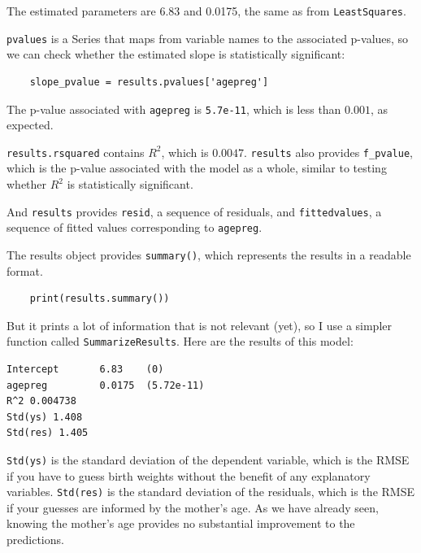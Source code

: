 \documentclass[12pt]{book}
\begin{document}
The estimated parameters are 6.83 and 0.0175, the same as
from \verb"LeastSquares".

\verb"pvalues" is a Series that maps from variable names to the associated
p-values, so we can check whether the estimated slope is statistically
significant:
   

\begin{verbatim}
    slope_pvalue = results.pvalues['agepreg']
\end{verbatim}

The p-value associated with \verb"agepreg" is \verb"5.7e-11", which
is less than $0.001$, as expected.

\verb"results.rsquared" contains $R^2$, which is $0.0047$.  \verb"results" also
provides \verb"f_pvalue", which is the p-value
associated with the model as a whole, similar to testing whether $R^2$
is statistically significant.

And \verb"results" provides \verb"resid", a sequence of residuals, and
\verb"fittedvalues", a sequence of fitted values corresponding to
\verb"agepreg".

The results object provides \verb"summary()", which
represents the results in a readable format.  

\begin{verbatim}
    print(results.summary())
\end{verbatim}

But it prints a lot of information that is not relevant (yet), so
I use a simpler function called \verb"SummarizeResults".  Here are
the results of this model:

\begin{verbatim}
Intercept       6.83    (0)
agepreg         0.0175  (5.72e-11)
R^2 0.004738
Std(ys) 1.408
Std(res) 1.405
\end{verbatim}

\verb"Std(ys)" is the standard deviation of the dependent variable,
which is the RMSE if you have to guess birth weights without the benefit of
any explanatory variables.  \verb"Std(res)" is the standard deviation
of the residuals, which is the RMSE if your guesses are informed
by the mother's age.  As we have already seen, knowing the mother's
age provides no substantial improvement to the predictions.
\end{document}
